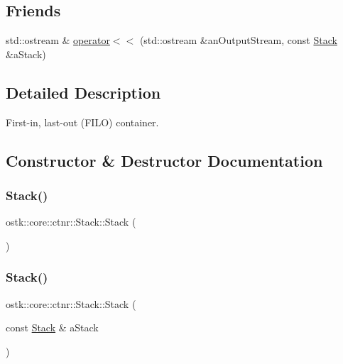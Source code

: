 \subsection*{Friends}
\begin{DoxyCompactItemize}
\item 
std\+::ostream \& \hyperlink{classostk_1_1core_1_1ctnr_1_1_stack_a042acac24eba66c740c7d3d48dfc0e46}{operator$<$$<$} (std\+::ostream \&an\+Output\+Stream, const \hyperlink{classostk_1_1core_1_1ctnr_1_1_stack}{Stack} \&a\+Stack)
\end{DoxyCompactItemize}


\subsection{Detailed Description}
First-\/in, last-\/out (F\+I\+LO) container. 

\subsection{Constructor \& Destructor Documentation}
\mbox{\label{classostk_1_1core_1_1ctnr_1_1_stack_a0e02851144c2afaf2202846f90f950dc}} 
\subsubsection{\texorpdfstring{Stack()}{Stack()}\hspace{0.1cm}{\footnotesize\ttfamily [1/2]}}
{\footnotesize\ttfamily ostk\+::core\+::ctnr\+::\+Stack\+::\+Stack (\begin{DoxyParamCaption}{ }\end{DoxyParamCaption})\hspace{0.3cm}{\ttfamily [delete]}}

\mbox{\label{classostk_1_1core_1_1ctnr_1_1_stack_add08ce0c3b6aaff44811abbe708bde78}} 
\subsubsection{\texorpdfstring{Stack()}{Stack()}\hspace{0.1cm}{\footnotesize\ttfamily [2/2]}}
{\footnotesize\ttfamily ostk\+::core\+::ctnr\+::\+Stack\+::\+Stack (\begin{DoxyParamCaption}\item[{const \hyperlink{classostk_1_1core_1_1ctnr_1_1_stack}{Stack} \&}]{a\+Stack }\end{DoxyParamCaption})}

